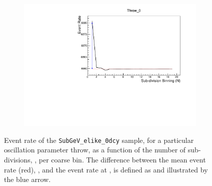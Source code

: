 \begin{figure}[h]                                                                                                                                                                                          
  \begin{subfigure}[t]{\textwidth}
    \includegraphics[width=\textwidth, trim={0mm 0mm 0mm 0mm}, clip,page=1]{Figures/Oscillation/ExampleCalculation.pdf}
  \end{subfigure}
  \caption{Event rate of the \texttt{SubGeV\_elike\_0dcy} sample, for a particular oscillation parameter throw, as a function of the number of sub-divisions, , per coarse bin. The difference between the mean event rate (red), \quickmath{\bar{\lambda}}, and the event rate at ,  is defined as  and illustrated by the blue arrow.}
  \label{fig:Oscillation_SK_ExampleCalculation}
\end{figure}

